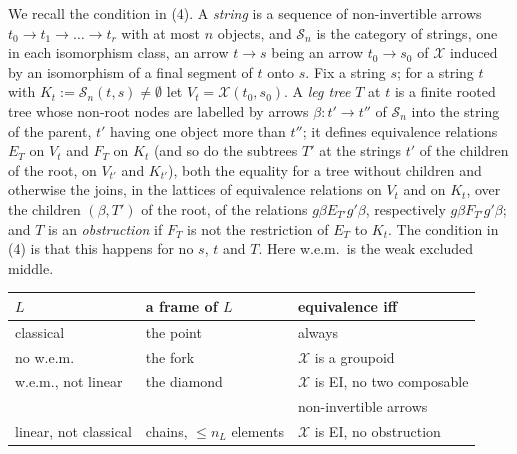\documentclass[11pt]{amsart}
\theoremstyle{definition}
\newcommand{\cX}{\mathcal X}
\newcommand{\cS}{\mathcal S}
\begin{document}
We recall the condition in (4). A \emph{string} is a sequence of
non-invertible arrows $t_0\to t_1\to\dots\to t_r$ with at most $n$
objects, and $\cS_n$ is the category of strings, one in each
isomorphism class, an arrow $t\to s$ being an arrow $t_0\to s_0$ of
$\cX$ induced by an isomorphism of a final segment of $t$ onto $s$.
Fix a string $s$; for a string $t$ with $K_t:=\cS_n(t,s)\ne\emptyset$
let $V_t=\cX(t_0,s_0)$. A \emph{leg tree} $T$ at $t$ is a finite rooted
tree whose non-root nodes are labelled by arrows $\beta\colon t'\to
t''$ of $\cS_n$ into the string of the parent, $t'$ having one object
more than $t''$; it defines equivalence relations $E_T$ on $V_t$ and
$F_T$ on $K_t$ (and so do the subtrees $T'$ at the strings $t'$ of the
children of the root, on $V_{t'}$ and $K_{t'}$), both the equality for a tree without children and
otherwise the joins, in the lattices of equivalence relations on
$V_t$ and on $K_t$, over the children $(\beta,T')$ of the root, of
the relations $g\beta\mathrel{E_{T'}}g'\beta$, respectively
$g\beta\mathrel{F_{T'}}g'\beta$; and $T$ is an \emph{obstruction} if
$F_T$ is not the restriction of $E_T$ to $K_t$. The condition in (4)
is that this happens for no $s$, $t$ and $T$.
Here w.e.m.\ is the weak excluded middle.
\begin{center}
\begin{tabular}{lll}
$L$&a frame of $L$&equivalence iff\\\hline
classical&the point&always\\
no w.e.m.&the fork&$\cX$ is a groupoid\\
w.e.m., not linear&the diamond&$\cX$ is EI, no two composable\\
&&non-invertible arrows\\
linear, not classical&chains, $\le n_L$ elements&$\cX$ is EI, no
obstruction
\end{tabular}
\end{center}
\end{document}
